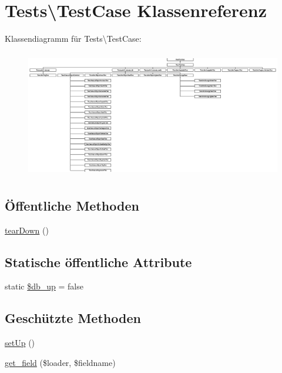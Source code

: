 \hypertarget{classTests_1_1TestCase}{}\section{Tests\textbackslash{}Test\+Case Klassenreferenz}
\label{classTests_1_1TestCase}
Klassendiagramm für Tests\textbackslash{}Test\+Case\+:\begin{figure}[H]
\begin{center}
\leavevmode
\includegraphics[height=5.587302cm]{d5/db5/classTests_1_1TestCase}
\end{center}
\end{figure}
\subsection*{Öffentliche Methoden}
\begin{DoxyCompactItemize}
\item 
\hyperlink{classTests_1_1TestCase_a3340a1a8d3a66dfa2838d2fd83303d1d}{tear\+Down} ()
\end{DoxyCompactItemize}
\subsection*{Statische öffentliche Attribute}
\begin{DoxyCompactItemize}
\item 
static \hyperlink{classTests_1_1TestCase_a8d9cc7598cd669177b073822710da329}{\$db\+\_\+up} = false
\end{DoxyCompactItemize}
\subsection*{Geschützte Methoden}
\begin{DoxyCompactItemize}
\item 
\hyperlink{classTests_1_1TestCase_ab32eb14f3a4d76ee2edd31a596481645}{set\+Up} ()
\item 
\hyperlink{classTests_1_1TestCase_a30c6102c189505ddeee4d6ede1aafe9b}{get\+\_\+field} (\$loader, \$fieldname)
\end{DoxyCompactItemize}
